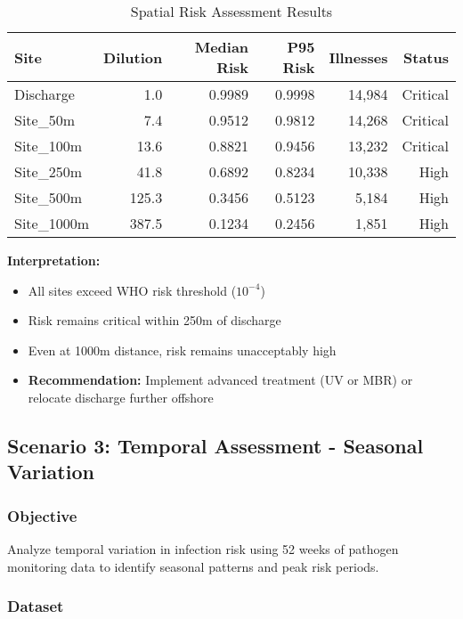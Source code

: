 \documentclass[11pt,a4paper]{article}
\begin{document}
\begin{table}[H]
\centering
\caption{Spatial Risk Assessment Results}
\scriptsize
\begin{tabular}{lrrrrr}
\toprule
\textbf{Site} & \textbf{Dilution} & \textbf{Median Risk} & \textbf{P95 Risk} & \textbf{Illnesses} & \textbf{Status} \\
\midrule
Discharge & 1.0 & 0.9989 & 0.9998 & 14,984 & \textcolor{riskred}{Critical} \\
Site\_50m & 7.4 & 0.9512 & 0.9812 & 14,268 & \textcolor{riskred}{Critical} \\
Site\_100m & 13.6 & 0.8821 & 0.9456 & 13,232 & \textcolor{riskred}{Critical} \\
Site\_250m & 41.8 & 0.6892 & 0.8234 & 10,338 & \textcolor{riskred}{High} \\
Site\_500m & 125.3 & 0.3456 & 0.5123 & 5,184 & \textcolor{riskred}{High} \\
Site\_1000m & 387.5 & 0.1234 & 0.2456 & 1,851 & \textcolor{riskred}{High} \\
\bottomrule
\end{tabular}
\end{table}

\textbf{Interpretation:}
\begin{itemize}[leftmargin=*]
    \item All sites exceed WHO risk threshold ($10^{-4}$)
    \item Risk remains critical within 250m of discharge
    \item Even at 1000m distance, risk remains unacceptably high
    \item \textbf{Recommendation:} Implement advanced treatment (UV or MBR) or relocate discharge further offshore
\end{itemize}

\subsection{Scenario 3: Temporal Assessment - Seasonal Variation}

\subsubsection{Objective}

Analyze temporal variation in infection risk using 52 weeks of pathogen monitoring data to identify seasonal patterns and peak risk periods.

\subsubsection{Dataset}
\end{document}
